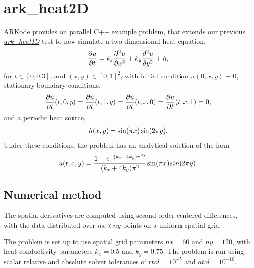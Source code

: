 \documentclass[letterpaper,10pt,english]{sphinxmanual}
\begin{document}
\section{ark\_heat2D}
\label{cpp_parallel:ark-heat2d}\label{cpp_parallel:id1}
ARKode provides on parallel C++ example problem, that extends our
previous {\hyperref[c_serial:ark-heat1d]{\emph{ark\_heat1D}}} test to now simulate a two-dimensional heat
equation,
\begin{gather}
\begin{split}\frac{\partial u}{\partial t} = k_x \frac{\partial^2 u}{\partial x^2}
                              + k_y \frac{\partial^2 u}{\partial y^2} + h,\end{split}\notag
\end{gather}
for $t \in [0, 0.3]$, and $(x,y) \in [0, 1]^2$, with initial
condition $u(0,x,y) = 0$, stationary boundary conditions,
\begin{gather}
\begin{split}\frac{\partial u}{\partial t}(t,0,y) = \frac{\partial u}{\partial t}(t,1,y) =
\frac{\partial u}{\partial t}(t,x,0) = \frac{\partial u}{\partial t}(t,x,1) = 0,\end{split}\notag
\end{gather}
and a periodic heat source,
\begin{gather}
\begin{split}h(x,y) = \sin(\pi x) \sin(2\pi y).\end{split}\notag
\end{gather}
Under these conditions, the problem has an analytical solution of the
form
\begin{gather}
\begin{split}u(t,x,y) = \frac{1 - e^{-(k_x+4k_y)\pi^2 t}}{(k_x+4k_y)\pi^2} \sin(\pi x) sin(2\pi y).\end{split}\notag
\end{gather}

\subsection{Numerical method}
\label{cpp_parallel:numerical-method}
The spatial derivatives are computed using second-order
centered differences, with the data distributed over
$nx\times ny$ points on a uniform spatial grid.

The problem is set up to use spatial grid parameters $nx=60$ and
$ny=120$, with heat conductivity parameters $k_x=0.5$ and
$k_y=0.75$.  The problem is run using scalar relative and
absolute solver tolerances of $rtol=10^{-5}$ and
$atol=10^{-10}$.
\end{document}
